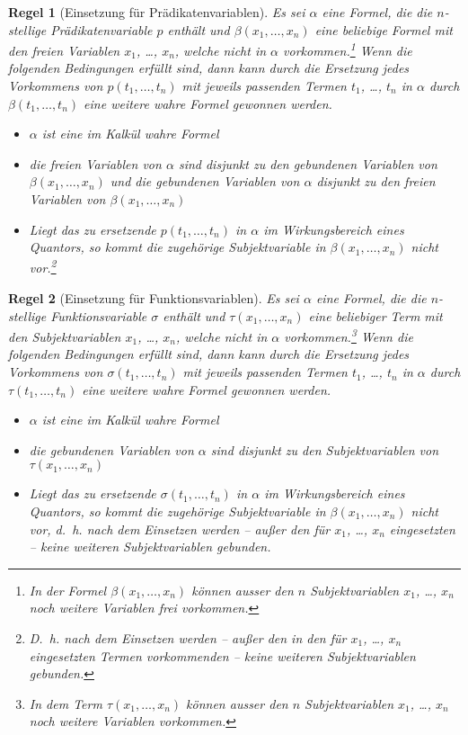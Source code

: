 \documentclass[a4paper,german,10pt,twoside]{book}
\newtheorem{rul}{Regel}
\begin{document}
{\begin{rul}[Einsetzung f{\"u}r Pr{\"a}dikatenvariablen]\label{predreplace}
Es sei $\alpha$ eine Formel, die die $n$-stellige Pr{\"a}dikatenvariable $p$ enth{\"a}lt und $\beta(x_1,
\ldots, x_n)$ eine beliebige Formel mit den freien Variablen $x_1$, \ldots, $x_n$, welche nicht in
$\alpha$ vorkommen.\footnote{In der Formel $\beta(x_1, \ldots, x_n)$ k{\"o}nnen ausser den $n$
Subjektvariablen $x_1$, \ldots, $x_n$ noch weitere Variablen frei vorkommen.} Wenn die folgenden
Bedingungen erf{\"u}llt sind, dann kann durch die Ersetzung jedes Vorkommens von $p(t_1, \ldots, t_n)$
mit jeweils passenden Termen $t_1$, \ldots, $t_n$ in $\alpha$ durch $\beta(t_1, \ldots, t_n)$ eine
weitere wahre Formel gewonnen werden.
\begin{itemize}
\item $\alpha$ ist eine im Kalk{\"u}l wahre Formel \item die freien Variablen von $\alpha$ sind
disjunkt zu den gebundenen Variablen von $\beta(x_1, \ldots, x_n)$ und die gebundenen Variablen von
$\alpha$ disjunkt zu den freien Variablen von $\beta(x_1, \ldots, x_n)$ \item Liegt das zu
ersetzende $p(t_1, \ldots, t_n)$ in $\alpha$ im Wirkungsbereich eines Quantors, so kommt die
zugeh{\"o}rige Subjektvariable in $\beta(x_1, \ldots, x_n)$ nicht vor.\footnote{D.~h. nach dem
Einsetzen werden -- au{\ss}er den in den f{\"u}r $x_1$, \ldots, $x_n$ eingesetzten Termen vorkommenden --
keine weiteren Subjektvariablen gebunden.}
\end{itemize}
\end{rul}

\begin{rul}[Einsetzung f{\"u}r Funktionsvariablen]\label{functreplace}
Es sei $\alpha$ eine Formel, die die $n$-stellige Funktionsvariable $\sigma$ enth{\"a}lt und $\tau(x_1,
\ldots, x_n)$ eine beliebiger Term mit den Subjektvariablen $x_1$, \ldots, $x_n$, welche nicht in
$\alpha$ vorkommen.\footnote{In dem Term $\tau(x_1, \ldots, x_n)$ k{\"o}nnen ausser den $n$
Subjektvariablen $x_1$, \ldots, $x_n$ noch weitere Variablen vorkommen.} Wenn die folgenden
Bedingungen erf{\"u}llt sind, dann kann durch die Ersetzung jedes Vorkommens von $\sigma(t_1, \ldots,
t_n)$ mit jeweils passenden Termen $t_1$, \ldots, $t_n$ in $\alpha$ durch $\tau(t_1, \ldots, t_n)$
eine weitere wahre Formel gewonnen werden.
\begin{itemize}
\item $\alpha$ ist eine im Kalk{\"u}l wahre Formel \item die gebundenen Variablen von $\alpha$ sind
disjunkt zu den Subjektvariablen von $\tau(x_1, \ldots, x_n)$ \item Liegt das zu ersetzende
$\sigma(t_1, \ldots, t_n)$ in $\alpha$ im Wirkungsbereich eines Quantors, so kommt die zugeh{\"o}rige
Subjektvariable in $\beta(x_1, \ldots, x_n)$ nicht vor, d.~h. nach dem Einsetzen werden -- au{\ss}er
den f{\"u}r $x_1$, \ldots, $x_n$ eingesetzten -- keine weiteren Subjektvariablen gebunden.
\end{itemize}
\end{rul}

}
\end{document}
